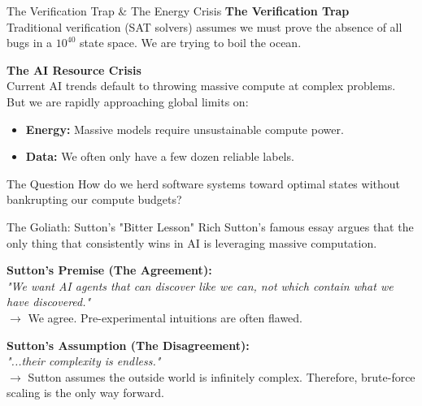 \begin{frame}{The Verification Trap \& The Energy Crisis}
  \vspace{0.3cm}
  \textbf{The Verification Trap} \\
  Traditional verification (SAT solvers) assumes we must prove the absence of all bugs in a $10^{40}$ state space. We are trying to boil the ocean.

  \vspace{0.4cm}
  \textbf{The AI Resource Crisis} \\
  Current AI trends default to throwing massive compute at complex problems. But we are rapidly approaching global limits on:
  \begin{itemize}
      \item \textbf{Energy:} Massive models require unsustainable compute power.
      \item \textbf{Data:} We often only have a few dozen reliable labels.
  \end{itemize}
  
  \vspace{0.4cm}
  \begin{block}{The Question}
  How do we herd software systems toward optimal states without bankrupting our compute budgets?
  \end{block}
\end{frame}

\begin{frame}{The Goliath: Sutton's "Bitter Lesson"}
  \vspace{0.3cm}
  Rich Sutton's famous essay argues that the only thing that consistently wins in AI is leveraging massive computation.

  \vspace{0.4cm}
  \textbf{Sutton's Premise (The Agreement):} \\
  \textit{"We want AI agents that can discover like we can, not which contain what we have discovered."} \\
  $\rightarrow$ We agree. Pre-experimental intuitions are often flawed.

  \vspace{0.4cm}
  \textbf{Sutton's Assumption (The Disagreement):} \\
  \textit{"...their complexity is endless."} \\
  $\rightarrow$ Sutton assumes the outside world is infinitely complex. Therefore, brute-force scaling is the only way forward.
\end{frame}

